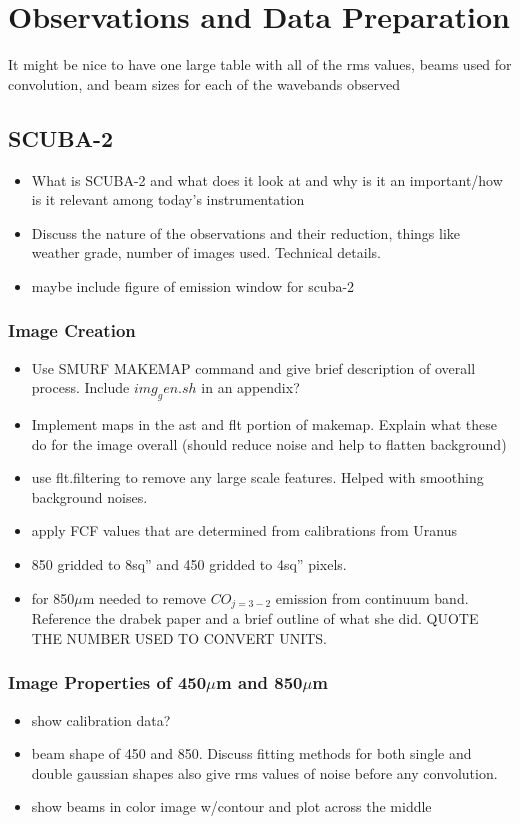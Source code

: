 \chapter{Observations and Data Preparation}\label{observations}

It might be nice to have one large table with all of the rms values, beams used for convolution, and beam sizes for each of the wavebands observed

\section{SCUBA-2}
\begin{itemize}
   \item What is SCUBA-2 and what does it look at and why is it an important/how is it relevant among today's instrumentation
   \item Discuss the nature of the observations and their reduction, things like weather grade, number of images used.  Technical details.
   \item maybe include figure of emission window for scuba-2
\end{itemize}

\subsection{Image Creation}
\begin{itemize}
   \item Use SMURF MAKEMAP command and give brief description of overall process.  Include $img_gen.sh$ in an appendix?
   \item Implement maps in the ast and flt portion of makemap.  Explain what these do for the image overall (should reduce noise and help to flatten background)
   \item use flt.filtering to remove any large scale features.  Helped with smoothing background noises.
   \item apply FCF values that are determined from calibrations from Uranus
   \item 850 gridded to 8sq'' and 450 gridded to 4sq'' pixels.
   \item for 850$\mu$m needed to remove $CO_{j=3-2}$ emission from continuum band.  Reference the drabek paper and a brief outline of what she did.  QUOTE THE NUMBER USED TO CONVERT UNITS.
\end{itemize}

\subsection{Image Properties of 450$\mu$m and 850$\mu$m}
\begin{itemize}
   \item show calibration data?
   \item beam shape of 450 and 850.  Discuss fitting methods for both single and double gaussian shapes also give rms values of noise before any convolution.
   \item show beams in color image w/contour and plot across the middle
\end{itemize}

